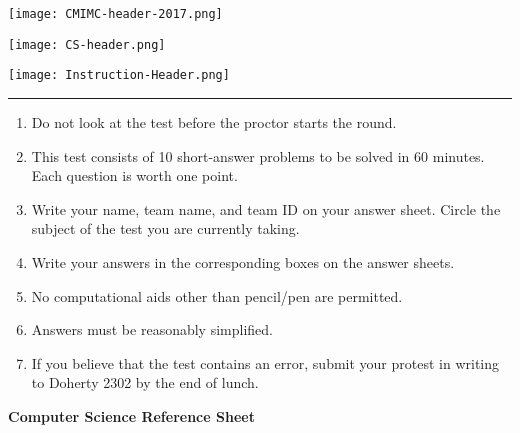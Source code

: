 \documentclass[10pt]{article}
\begin{document}
\thispagestyle{empty}
\begin{center}

\vspace*{90pt}

\texttt{[image: CMIMC-header-2017.png]}

\texttt{[image: CS-header.png]}

\vspace{1.6in}

\texttt{[image: Instruction-Header.png]}
\noindent\rule{17.7cm}{2pt}
\end{center}

\vspace{10pt}

\begin{enumerate}
\large
\item Do not look at the test before the proctor starts the round.

\item This test consists of 10 short-answer problems to be solved in 60 minutes.
	Each question is worth one point.

\item Write your name, team name, and team ID on your answer sheet. Circle the
	subject of the test you are currently taking.

\item Write your answers in the corresponding boxes on the answer sheets.

\item No computational aids other than pencil/pen are permitted.

\item Answers must be reasonably simplified.

\item If you believe that the test contains an error, submit your protest in writing to Doherty 2302 by the end of lunch.
\end{enumerate}
\newpage

\setlength\parindent{0pt}

\begin{center}
\Huge\textsf{\textbf{Computer Science Reference Sheet}}
\end{center}

\vspace{5pt}
\end{document}
